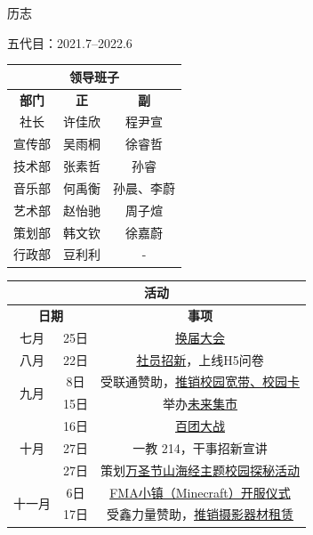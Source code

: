 \documentclass{paper}
\renewcommand{\thead}[1]{\textbf{ #1}}
\begin{document}
\begin{section}{历志}
\begin{subsection}{五代目：2021.7--2022.6}
		\begin{table}[H]\begin{center}
			\begin{tabular}{|c|c|c|}
				\hline
				\multicolumn{3}{|c|}{\thead{领导班子}} \\ \hline
				\thead{部门} & \thead{正} & \thead{副} \\ \hline
				社长 & 许佳欣 & 程尹宣 \\ \hline
				宣传部 & 吴雨桐 & 徐睿哲 \\ \hline
				技术部 & 张素哲 & 孙睿 \\ \hline
				音乐部 & 何禹衡 & 孙晨、李蔚 \\ \hline
				艺术部 & 赵怡驰 & 周子煊 \\ \hline
				策划部 & 韩文钦 & 徐嘉蔚 \\ \hline
				行政部\tablefootnote{
					后废除。
				} & 豆利利 & - \\ \hline
			\end{tabular}
		\end{center}\end{table}

		\begin{table}[H]\begin{center}
			\begin{tabular}{|c|c|c|}
				\hline
				\multicolumn{3}{|c|}{\thead{活动}} \\ \hline
				\multicolumn{2}{|c|}{\thead{日期}} & \thead{事项} \\ \hline
				\multirow{1}{*}{七月}
				& 25日 & \href{https://mp.weixin.qq.com/s/iErzB45wCf2sZsZ4gA1SPw}{换届大会} \\ \hline
				\multirow{1}{*}{八月}
				& 22日 & \href{https://mp.weixin.qq.com/s/LbFjAq4j_gmT7oDZ8IieRg}{社员招新}，上线H5问卷 \\ \hline
				\multirow{2}{*}{九月}
				& 8日 & 受联通赞助，\href{https://mp.weixin.qq.com/s/JUnJnFT0_WyGKbH6L9pzCA}{推销校园宽带、校园卡} \\
				& 15日 & 举办\href{https://mp.weixin.qq.com/s/_tvGBaQTgMLaH_zO8iSEZQ}{未来集市} \\ \hline
				\multirow{3}{*}{十月}
				& 16日 & \href{https://mp.weixin.qq.com/s/n9nzIYrqBprmeXayvIfdTw}{百团大战} \\
				& 27日 & 一教 214，干事招新宣讲 \\
				& 27日 & 策划\href{https://mp.weixin.qq.com/s/8tIWxoLClfSD-pURJ34ang}{万圣节山海经主题校园探秘活动} \\ \hline
				\multirow{2}{*}{十一月}
				& 6日 & \href{https://mp.weixin.qq.com/s/PgdX4etbP3VLUBe5LkihHw}{FMA小镇（Minecraft）开服仪式} \\
				& 17日 & 受鑫力量赞助，\href{https://mp.weixin.qq.com/s/BH7A5LyHfjQoPITBy7f7Qg}{推销摄影器材租赁} \\ \hline
			\end{tabular}
		\end{center}\end{table}


\end{subsection}
\end{section}
\end{document}
